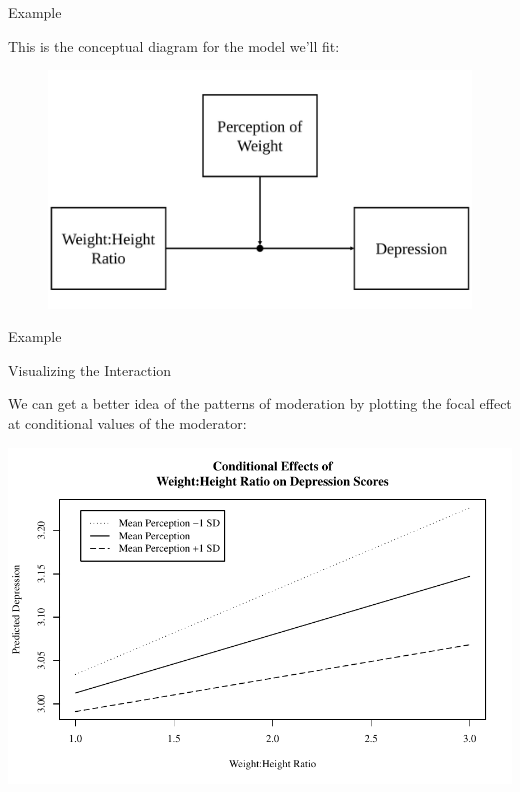 \documentclass{beamer}
\newcommand{\vb}[0]{\vspace{6pt}}
\begin{document}
\begin{frame}{Example}

  This is the conceptual diagram for the model we'll fit:

  \begin{figure}
    \includegraphics[width=\textwidth]{figures/modExample1.pdf}
  \end{figure}

\end{frame}


\begin{frame}[allowframebreaks]{Example}




\pagebreak

\pagebreak


\end{frame}



\begin{frame}{Visualizing the Interaction}

  We can get a better idea of the patterns of moderation by plotting
  the focal effect at conditional values of the moderator:\\
  \vb

\includegraphics{sweaveFiles/-006}

\end{frame}
\end{document}
